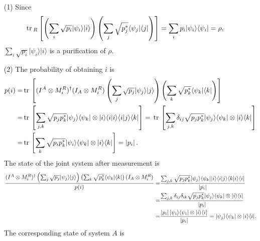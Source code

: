 \documentclass[en]{sol-man}
\begin{document}
\begin{sol}
    \begin{itemize}
        \item[(1)] Since
        \begin{align}
            \,\mathrm{tr}\,_R\left[\left(\sum_i\sqrt{p_i}\lvert\psi_i\rangle\lvert i\rangle\right)\left(\sum_j\sqrt{p_j^*}\langle\psi_j\rvert\langle j\rvert\right)\right]=\sum_ip_i\lvert\psi_i\rangle\langle\psi_i\rvert=\rho,
        \end{align}
        $\sum_i\sqrt{p_i}\lvert\psi_i\rangle\lvert i\rangle$ is a purification of $\rho$.
        \item[(2)] The probability of obtaining $i$ is
        \begin{align}
            \notag p(i)=&\,\mathrm{tr}\,\left[(I^A\otimes M_i^R)^\dagger(I_A\otimes M_i^R)\left(\sum_j\sqrt{p_j}\lvert\psi_j\rangle\lvert j\rangle\right)\left(\sum_k\sqrt{p_k^*}\langle\psi_k\rvert\langle k\rvert\right)\right]\\
            \notag=&\,\mathrm{tr}\,\left[\sum_{j,k}\sqrt{p_jp_k^*}\lvert\psi_j\rangle\langle\psi_k\rvert\otimes\lvert i\rangle\langle i\vert i\rangle\langle i\vert j\rangle\langle k\rvert\right]=\,\mathrm{tr}\,\left[\sum_{j,k}\delta_{ij}\sqrt{p_jp_k^*}\lvert\psi_j\rangle\langle\psi_k\rvert\otimes\lvert i\rangle\langle k\rvert\right]\\
            =&\,\mathrm{tr}\,\left[\sum_k\sqrt{p_ip_k^*}\lvert\psi_i\rangle\langle\psi_k\rvert\otimes\lvert i\rangle\langle k\rvert\right]=\left\lvert p_i\right\rvert.
        \end{align}
        The state of the joint system after measurement is
        \begin{align}
            \notag\frac{(I^A\otimes M_i^R)^{\dagger}\left(\sum_j\sqrt{p_j}\lvert\psi_j\rangle\lvert j\rangle\right)\left(\sum_k\sqrt{p_k^*}\langle\psi_k\rvert\langle k\rvert\right)(I_A\otimes M_i^R)}{p(i)}=&\frac{\sum_{j,k}\sqrt{p_jp_k^*}\lvert\psi_j\rangle\langle\psi_k\rvert\lvert i\rangle\langle i\vert j\rangle\langle k\vert i\rangle\langle i\rvert}{\left\lvert p_i\right\rvert}\\
            \notag=&\frac{\sum_{j,k}\delta_{ij}\delta_{ik}\sqrt{p_jp_k^*}\lvert\psi_j\rangle\langle\psi_k\rvert\otimes\lvert i\rangle\langle i\rvert}{\left\lvert p_i\right\rvert}\\
            =&\frac{\left\lvert p_i\right\rvert\lvert\psi_i\rangle\langle\psi_i\rvert\otimes\lvert i\rangle\langle i\rvert}{\left\lvert p_i\right\rvert}=\lvert\psi_j\rangle\langle\psi_k\rvert\otimes\lvert i\rangle\langle i\rvert.
        \end{align}
        The corresponding state of system $A$ is

\end{itemize}
\end{sol}
\end{document}
